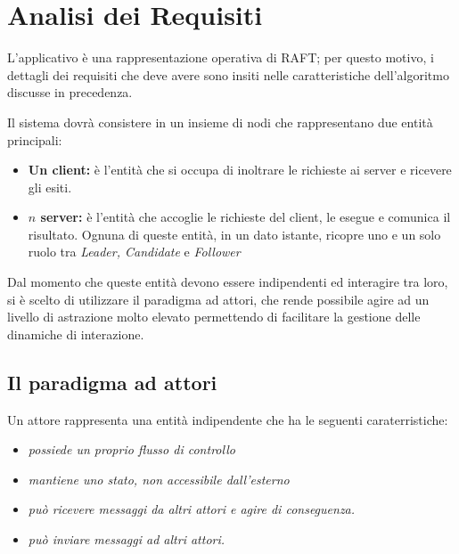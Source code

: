 \section{Analisi dei Requisiti}
L'applicativo è una rappresentazione operativa di RAFT; per questo motivo, i dettagli dei requisiti che deve avere sono insiti nelle caratteristiche dell'algoritmo discusse in precedenza. 

Il sistema dovrà consistere in un insieme di nodi che rappresentano due entità principali:
	\begin{itemize}
		\item \textbf{Un client:} è l'entità che si occupa di inoltrare le richieste ai server e ricevere gli esiti.
		\item \textbf{$n$ server:} è l'entità che accoglie le richieste del client, le esegue e comunica il risultato. Ognuna di queste entità, in un dato istante, ricopre uno e un solo ruolo tra \textit{Leader, Candidate} e \textit{Follower}
	\end{itemize}

Dal momento che queste entità devono essere indipendenti ed interagire tra loro, si è scelto di utilizzare il paradigma ad attori, che rende possibile agire ad un livello di astrazione molto elevato permettendo di facilitare la gestione delle dinamiche di interazione.


	\subsection{Il paradigma ad attori} \label{Actors}
	Un attore rappresenta una entità indipendente che ha le seguenti caraterristiche:
	\begin{itemize}
		\item \emph{possiede un proprio flusso di controllo}
		\item \emph{mantiene uno stato, non accessibile dall'esterno}
		\item \emph{può ricevere messaggi da altri attori e agire di conseguenza.}
		\item \emph{può inviare messaggi ad altri attori.}
	\end{itemize}

